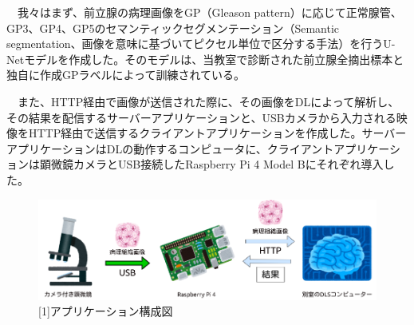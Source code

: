 　我々はまず、前立腺の病理画像をGP（Gleason pattern）に応じて正常腺管、GP3、GP4、GP5のセマンティックセグメンテーション（Semantic segmentation、画像を意味に基づいてピクセル単位で区分する手法）を行うU-Netモデルを作成した。そのモデルは、当教室で診断された前立腺全摘出標本と独自に作成GPラベルによって訓練されている。\par
\vspace{0.5zh}
　また、HTTP経由で画像が送信された際に、その画像をDLによって解析し、その結果を配信するサーバーアプリケーションと、USBカメラから入力される映像をHTTP経由で送信するクライアントアプリケーションを作成した。サーバーアプリケーションはDLの動作するコンピュータに、クライアントアプリケーションは顕微鏡カメラとUSB接続したRaspberry Pi 4 Model Bにそれぞれ導入した。\par

\begin{figure}
\begin{center}
\includegraphics[width=\columnwidth]{fig1.png}
\small [1]アプリケーション構成図
\end{center}
\end{figure}
\vspace{1zh}
